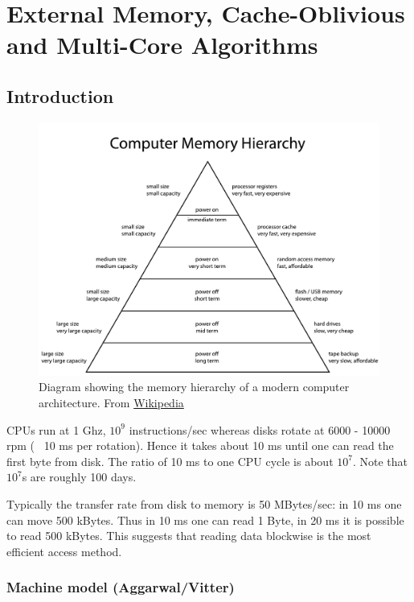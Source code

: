 \chapter{External Memory, Cache-Oblivious and Multi-Core Algorithms}

\section{Introduction}

\begin{figure}
\begin{center}
\includegraphics[width=0.8\linewidth]{./images/ComputerMemoryHierarchy}
\end{center}
\caption{Diagram showing the memory hierarchy of a modern computer architecture. From \href{http://en.wikipedia.org/wiki/File:ComputerMemoryHierarchy.svg}{Wikipedia}}
\end{figure}

CPUs run at 1 Ghz, $10^9$ instructions/sec whereas disks rotate at 6000 - 10000 rpm ( ~10 ms per rotation). Hence it takes about 10 ms until one can read the first byte from disk. The ratio of 10 ms to one CPU cycle is about $10^7$. Note that $10^7$s are roughly 100 days.

Typically the transfer rate from disk to memory is 50 MBytes/sec: in 10 ms one can move 500 kBytes. Thus in 10 ms one can read 1 Byte, in 20 ms it is possible to read 500 kBytes. This  suggests that reading data blockwise is the most efficient access method.

\subsection{Machine model (Aggarwal/Vitter)}

